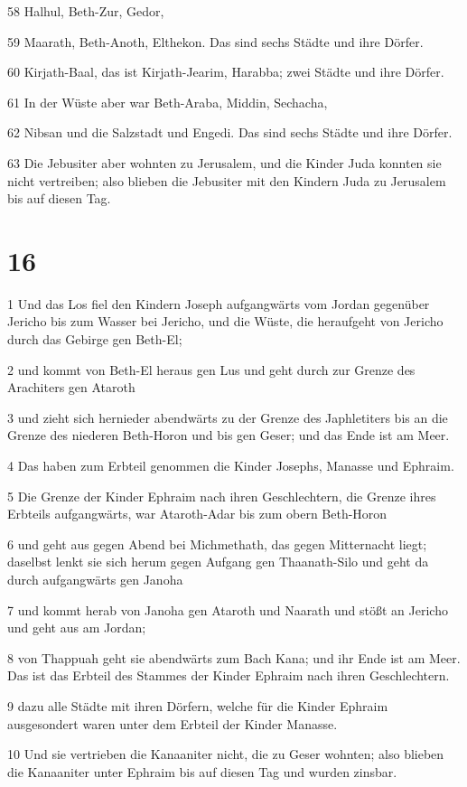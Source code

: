\par 58 Halhul, Beth-Zur, Gedor,
\par 59 Maarath, Beth-Anoth, Elthekon. Das sind sechs Städte und ihre Dörfer.
\par 60 Kirjath-Baal, das ist Kirjath-Jearim, Harabba; zwei Städte und ihre Dörfer.
\par 61 In der Wüste aber war Beth-Araba, Middin, Sechacha,
\par 62 Nibsan und die Salzstadt und Engedi. Das sind sechs Städte und ihre Dörfer.
\par 63 Die Jebusiter aber wohnten zu Jerusalem, und die Kinder Juda konnten sie nicht vertreiben; also blieben die Jebusiter mit den Kindern Juda zu Jerusalem bis auf diesen Tag.

\chapter{16}

\par 1 Und das Los fiel den Kindern Joseph aufgangwärts vom Jordan gegenüber Jericho bis zum Wasser bei Jericho, und die Wüste, die heraufgeht von Jericho durch das Gebirge gen Beth-El;
\par 2 und kommt von Beth-El heraus gen Lus und geht durch zur Grenze des Arachiters gen Ataroth
\par 3 und zieht sich hernieder abendwärts zu der Grenze des Japhletiters bis an die Grenze des niederen Beth-Horon und bis gen Geser; und das Ende ist am Meer.
\par 4 Das haben zum Erbteil genommen die Kinder Josephs, Manasse und Ephraim.
\par 5 Die Grenze der Kinder Ephraim nach ihren Geschlechtern, die Grenze ihres Erbteils aufgangwärts, war Ataroth-Adar bis zum obern Beth-Horon
\par 6 und geht aus gegen Abend bei Michmethath, das gegen Mitternacht liegt; daselbst lenkt sie sich herum gegen Aufgang gen Thaanath-Silo und geht da durch aufgangwärts gen Janoha
\par 7 und kommt herab von Janoha gen Ataroth und Naarath und stößt an Jericho und geht aus am Jordan;
\par 8 von Thappuah geht sie abendwärts zum Bach Kana; und ihr Ende ist am Meer. Das ist das Erbteil des Stammes der Kinder Ephraim nach ihren Geschlechtern.
\par 9 dazu alle Städte mit ihren Dörfern, welche für die Kinder Ephraim ausgesondert waren unter dem Erbteil der Kinder Manasse.
\par 10 Und sie vertrieben die Kanaaniter nicht, die zu Geser wohnten; also blieben die Kanaaniter unter Ephraim bis auf diesen Tag und wurden zinsbar.

